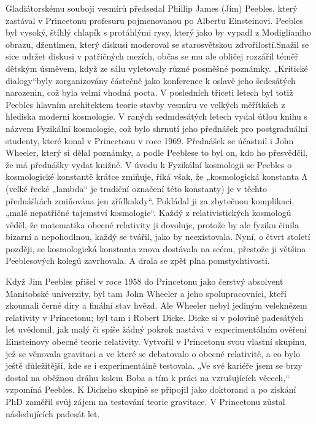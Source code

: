   Gladiátorskému souboji vesmírů předsedal Phillip James (Jim) Peebles, který zastával v Princetonu
  profesuru pojmenovanou po Albertu Einsteinovi. Peebles byl vysoký, štíhlý chlapík s protáhlými
  rysy, který jako by vypadl z Modiglianiho obrazu, džentlmen, který diskusi moderoval se
  starosvětskou zdvořilostí.Snažil se sice udržet diskusi v patřičných mezích, občas se mu ale
  obličej rozzářil téměř dětským úsměvem, když ze sálu vyletovaly různé posměšné poznámky. „Kritické
  dialogy“byly zorganizovány částečně jako konference k oslavě jeho šedesátých narozenin, což byla
  velmi vhodná pocta. V posledních třiceti letech byl totiž Peebles hlavním architektem teorie
  stavby vesmíru ve velkých měřítkách z hlediska moderní kosmologie. V raných sedmdesátých letech
  vydal útlou knihu s názvem Fyzikální kosmologie, což bylo shrnutí jeho přednášek pro postgraduální
  studenty, které konal v Princetonu v roce 1969. Přednášek se účastnil i John Wheeler, který si
  dělal poznámky, a podle Peeblese to byl on, kdo ho přesvědčil, že má přednášky vydat knižně. V
  úvodu k Fyzikální kosmologii se Peebles o kosmologické konstantě krátce zmiňuje, říká však, že
  „kosmologická konstanta Λ (velké řecké „lambda“ je tradiční označení této konstanty) je v těchto
  přednáškách zmiňována jen zřídkakdy“. Pokládal ji za zbytečnou komplikaci, „malé nepatřičné
  tajemství kosmologie“. Každý z relativistických kosmologů věděl, že matematika obecné relativity
  ji dovoluje, protože by ale fyziku činila bizarní a nepohodlnou, každý se tvářil, jako by
  neexistovala. Nyní, o čtvrt století později, se kosmologická konstanta znova dostávala na scénu,
  přestože ji většina Peeblesových kolegů zavrhovala. A drala se zpět plna pomstychtivosti. 
  
  Když Jim Peebles přišel v roce 1958 do Princetonu jako čerstvý absolvent Manitobské univerzity,
  byl tam John Wheeler a jeho spolupracovníci, kteří zkoumali černé díry a finální stav hvězd. Ale
  Wheeler nebyl jediným veleknězem relativity v Princetonu; byl tam i Robert Dicke. Dicke si v
  polovině padesátých let uvědomil, jak malý či spíše žádný pokrok nastává v experimentálním ověření
  Einsteinovy obecné teorie relativity. Vytvořil v Princetonu svou vlastní skupinu, jež se věnovala
  gravitaci a ve které se debatovalo o obecné relativitě, a co bylo ještě důležitější, kde se i
  experimentálně testovala. „Ve své kariéře jsem se brzy dostal na oběžnou dráhu kolem Boba a tím k
  práci na vzrušujících věcech,“ vzpomíná Peebles. K Dickeho skupině se připojil jako doktorand a po
  získání PhD zaměřil svůj zájem na testování teorie gravitace. V Princetonu zůstal následujících
  padesát let. 
  
